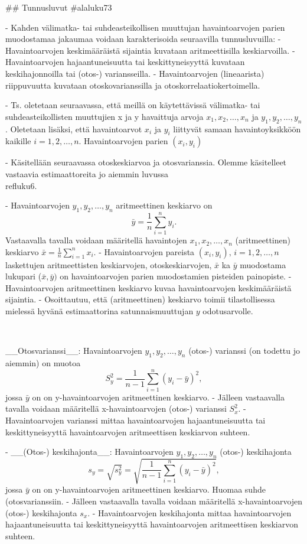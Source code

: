 \documentclass[
]{book}
\begin{document}
\begin{itemize}
## Tunnusluvut {#alaluku73}

- Kahden välimatka- tai suhdeasteikollisen muuttujan havaintoarvojen parien muodostamaa jakaumaa voidaan karakterisoida seuraavilla tunnusluvuilla:
  - Havaintoarvojen keskimääräistä sijaintia kuvataan aritmeettisilla keskiarvoilla.
  - Havaintoarvojen hajaantuneisuutta tai keskittyneisyyttä kuvataan keskihajonnoilla tai (otos-) variansseilla.
  - Havaintoarvojen (lineaarista) riippuvuutta kuvataan otoskovarianssilla ja otoskorrelaatiokertoimella.

- Ts. oletetaan seuraavassa, että meillä on käytettävissä välimatka- tai suhdeasteikollisten muuttujien x ja y havaittuja arvoja $x_1, x_2, \ldots, x_n$ ja $y_1, y_2, \ldots, y_n$. Oletetaan lisäksi, että havaintoarvot $x_i$ ja $y_i$ liittyvät samaan havaintoyksikköön kaikille $i = 1, 2, \ldots, n$. Havaintoarvojen parien $(x_i, y_i)$

- Käsitellään seuraavassa otoskeskiarvoa ja otosvarianssia. Olemme käsitelleet vastaavia estimaattoreita jo aiemmin luvussa \\ref{luku6}.

- Havaintoarvojen $y_1, y_2,\ldots, y_n$ aritmeettinen keskiarvo on
$$
    \bar{y} = \frac{1}{n} \sum_{i=1}^{n} y_i.
$$
Vastaavalla tavalla voidaan määritellä havaintojen $x_1, x_2, \ldots, x_n$ (aritmeettinen) keskiarvo $\bar{x}=\frac{1}{n}\sum_{i=1}^{n}x_i$.
  - Havaintoarvojen pareista $(x_i, y_i ), \, i = 1, 2,\ldots,n$ laskettujen aritmeettisten keskiarvojen, otoskeskiarvojen, $\bar{x}$ ka $\bar{y}$ muodostama lukupari ($\bar{x}, \bar{y})$ on havaintoarvojen parien muodostamien pisteiden painopiste.
  - Havaintoarvojen aritmeettinen keskiarvo kuvaa havaintoarvojen keskimääräistä sijaintia.
  - Osoittautuu, että (aritmeettinen) keskiarvo toimii tilastollisessa mielessä hyvänä estimaattorina satunnaismuuttujan $y$ odotusarvolle. 

\
\

__Otosvarianssi__: Havaintoarvojen $y_1, y_2,\ldots, y_n$ (otos-) varianssi (on todettu jo aiemmin) on muotoa
$$
    S^2_y = \frac{1}{n-1} \sum_{i=1}^{n} (y_i - \bar{y})^2,
$$
jossa $\bar{y}$ on on y-havaintoarvojen aritmeettinen keskiarvo. 
  - Jälleen vastaavalla tavalla voidaan määritellä x-havaintoarvojen (otos-) varianssi $S^2_x$.
  - Havaintoarvojen varianssi mittaa havaintoarvojen hajaantuneisuutta tai keskittyneisyyttä havaintoarvojen aritmeettisen keskiarvon suhteen.
    
- __(Otos-) keskihajonta__: Havaintoarvojen $y_1, y_2,\ldots, y_n$ (otos-) keskihajonta
$$
    s_y = \sqrt{s^2_y} = \sqrt{\frac{1}{n-1} \sum_{i=1}^{n} (y_i - \bar{y})^2},
$$
jossa $\bar{y}$ on on y-havaintoarvojen aritmeettinen keskiarvo. Huomaa suhde (otosvarianssiin.
  - Jälleen vastaavalla tavalla voidaan määritellä x-havaintoarvojen (otos-) keskihajonta $s_x$.
  - Havaintoarvojen keskihajonta mittaa havaintoarvojen hajaantuneisuutta tai keskittyneisyyttä havaintoarvojen aritmeettisen keskiarvon suhteen.


\end{itemize}
\end{document}
